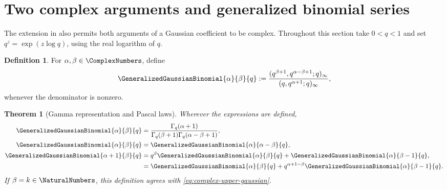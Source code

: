 \documentclass[11pt,a4paper,oneside,openany]{book}
\newtheorem{theorem}{Theorem}[chapter]
\theoremstyle{definition}
\newtheorem{definition}[definition]{Definition}
\theoremstyle{remark}
\begin{document}
\section{Two complex arguments and generalized binomial series}

The extension in  also permits both arguments of a Gaussian coefficient to be complex.  Throughout this section take $0<q<1$ and set $q^z=\exp(z\log q)$, using the real logarithm of $q$.

\begin{definition}\label{def:complex-gaussian}
For $\alpha,\beta\in\ComplexNumbers$, define
\[
 \GeneralizedGaussianBinomial{\alpha}{\beta}{q}
 :=\frac{(q^{\beta+1},q^{\alpha-\beta+1};q)_\infty}
 {(q,q^{\alpha+1};q)_\infty},
 \label{eq:complex-gaussian}
\]
whenever the denominator is nonzero.
\end{definition}

\begin{theorem}[Gamma representation and Pascal laws]\label{thm:complex-gaussian-properties}
Wherever the expressions are defined,
\begin{align}
 \GeneralizedGaussianBinomial{\alpha}{\beta}{q}
 &=\frac{\Gamma_q(\alpha+1)}
 {\Gamma_q(\beta+1)\Gamma_q(\alpha-\beta+1)},
 \label{eq:complex-gaussian-gamma}\\
 \GeneralizedGaussianBinomial{\alpha}{\beta}{q}
 &=\GeneralizedGaussianBinomial{\alpha}{\alpha-\beta}{q},
 \label{eq:complex-gaussian-symmetry}\\
 \GeneralizedGaussianBinomial{\alpha+1}{\beta}{q}
 &=q^\beta\GeneralizedGaussianBinomial{\alpha}{\beta}{q}
   +\GeneralizedGaussianBinomial{\alpha}{\beta-1}{q},
 \label{eq:complex-pascal-a}\\
 &=\GeneralizedGaussianBinomial{\alpha}{\beta}{q}
   +q^{\alpha+1-\beta}
    \GeneralizedGaussianBinomial{\alpha}{\beta-1}{q}.
 \label{eq:complex-pascal-b}
\end{align}
If $\beta=k\in\NaturalNumbers$, this definition agrees with \eqref{eq:complex-upper-gaussian}.
\end{theorem}
\end{document}
